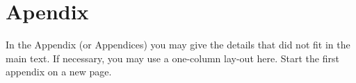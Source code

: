 
\section{Apendix}\label{ap:appendix}
In the Appendix (or Appendices) you may give the details that did not fit in the main text.
If necessary, you may use a one-column lay-out here.
Start the first appendix on a new page.
